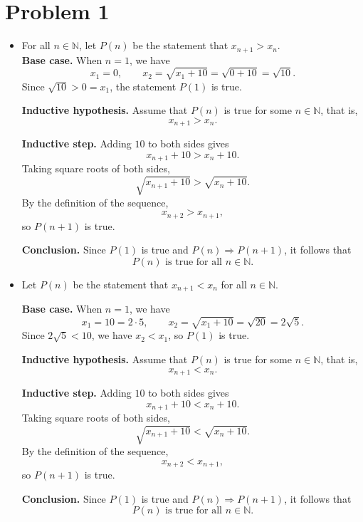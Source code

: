 \documentclass[12pt]{article}
\begin{document}
\section*{Problem 1}
\begin{itemize}
    \item[(a)]
        For all $n \in \mathbb{N}$, let $P(n)$ be the statement that $x_{n+1} > x_n$.\\

\textbf{Base case.}  
When $n = 1$, we have
\[
x_1 = 0, \qquad
x_2 = \sqrt{x_1 + 10} = \sqrt{0 + 10} = \sqrt{10}.
\]
Since $\sqrt{10} > 0 = x_1$, the statement $P(1)$ is true.

\medskip

\textbf{Inductive hypothesis.}  
Assume that $P(n)$ is true for some $n \in \mathbb{N}$, that is,
\[
x_{n+1} > x_n.
\]

\medskip

\textbf{Inductive step.}  
Adding $10$ to both sides gives
\[
x_{n+1} + 10 > x_n + 10.
\]
Taking square roots of both sides,
\[
\sqrt{x_{n+1} + 10} > \sqrt{x_n + 10}.
\]
By the definition of the sequence,
\[
x_{n+2} > x_{n+1},
\]
so $P(n+1)$ is true.

\medskip

\textbf{Conclusion.}  
Since $P(1)$ is true and $P(n) \Rightarrow P(n+1)$, it follows that
\[
P(n) \text{ is true for all } n \in \mathbb{N}.
\]
    \item[(b)]


Let $P(n)$ be the statement that $x_{n+1} < x_n$ for all $n \in \mathbb{N}$.

\medskip

\textbf{Base case.}  
When $n = 1$, we have
\[
x_1 = 10 = 2 \cdot 5,
\qquad
x_2 = \sqrt{x_1 + 10} = \sqrt{20} = 2\sqrt{5}.
\]
Since $2\sqrt{5} < 10$, we have $x_2 < x_1$, so $P(1)$ is true.

\medskip

\textbf{Inductive hypothesis.}  
Assume that $P(n)$ is true for some $n \in \mathbb{N}$, that is,
\[
x_{n+1} < x_n.
\]

\medskip

\textbf{Inductive step.}  
Adding $10$ to both sides gives
\[
x_{n+1} + 10 < x_n + 10.
\]
Taking square roots of both sides,
\[
\sqrt{x_{n+1} + 10} < \sqrt{x_n + 10}.
\]
By the definition of the sequence,
\[
x_{n+2} < x_{n+1},
\]
so $P(n+1)$ is true.

\medskip

\textbf{Conclusion.}  
Since $P(1)$ is true and $P(n) \Rightarrow P(n+1)$, it follows that
\[
P(n) \text{ is true for all } n \in \mathbb{N}.
\]
\end{itemize}
\end{document}
